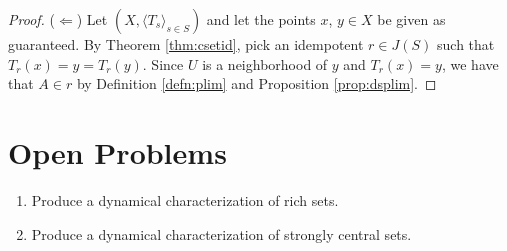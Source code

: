 \documentclass[12pt]{article}
\theoremstyle{plain}
\theoremstyle{definition}
\newcommand{\la}{\langle}
\newcommand{\ra}{\rangle}
\newcommand{\ds}{(X, \la T_s \ra_{s\in S})}
\begin{document}
\begin{proof}
   ($\Leftarrow$) Let $\ds$ and let the points $x$, $y \in X$ be given as
   guaranteed.
   By Theorem \ref{thm:csetid}, pick an idempotent $r \in J(S)$
   such that $T_r(x) = y = T_r(y)$. 
   Since $U$ is a neighborhood of $y$ and $T_r(x) = y$, we have that
   $A \in r$ by Definition \ref{defn:plim} and Proposition \ref{prop:dsplim}. 
 \end{proof}

\section{Open Problems}
  \begin{enumerate}
    \item Produce a dynamical characterization of rich sets.
    \item Produce a dynamical characterization of strongly central sets.
  \end{enumerate}

\theendnotes



\end{document}
